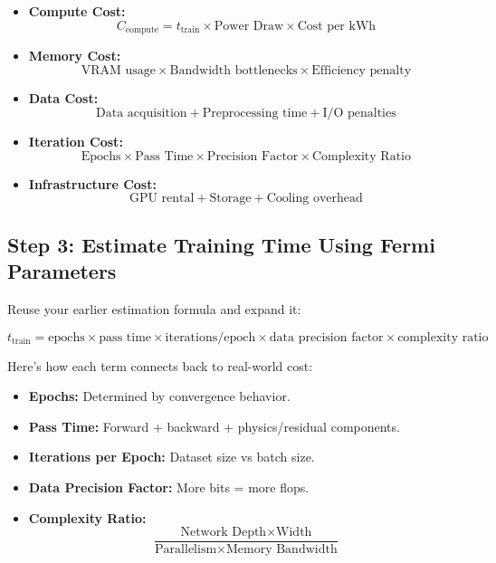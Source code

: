 \begin{itemize}
  \item \textbf{Compute Cost:} 
    \[
    C_{\text{compute}} = t_{\text{train}} \times \text{Power Draw} \times \text{Cost per kWh}
    \]

  \item \textbf{Memory Cost:} 
    \[
    \text{VRAM usage} \times \text{Bandwidth bottlenecks} \times \text{Efficiency penalty}
    \]

  \item \textbf{Data Cost:} 
    \[
    \text{Data acquisition} + \text{Preprocessing time} + \text{I/O penalties}
    \]

  \item \textbf{Iteration Cost:} 
    \[
    \text{Epochs} \times \text{Pass Time} \times \text{Precision Factor} \times \text{Complexity Ratio}
    \]

  \item \textbf{Infrastructure Cost:} 
    \[
    \text{GPU rental} + \text{Storage} + \text{Cooling overhead}
    \]
\end{itemize}

\subsection{Step 3: Estimate Training Time Using Fermi Parameters}

Reuse your earlier estimation formula and expand it:

\[
t_{\text{train}} = \text{epochs} \times \text{pass time} \times \text{iterations/epoch} \times \text{data precision factor} \times \text{complexity ratio}
\]

Here’s how each term connects back to real-world cost:

\begin{itemize}
    \item \textbf{Epochs:} Determined by convergence behavior.
    \item \textbf{Pass Time:} Forward + backward + physics/residual components.
    \item \textbf{Iterations per Epoch:} Dataset size vs batch size.
    \item \textbf{Data Precision Factor:} More bits = more flops.
    \item \textbf{Complexity Ratio:} 
      \[
      \frac{\text{Network Depth} \times \text{Width}}{\text{Parallelism} \times \text{Memory Bandwidth}}
      \]
\end{itemize}

